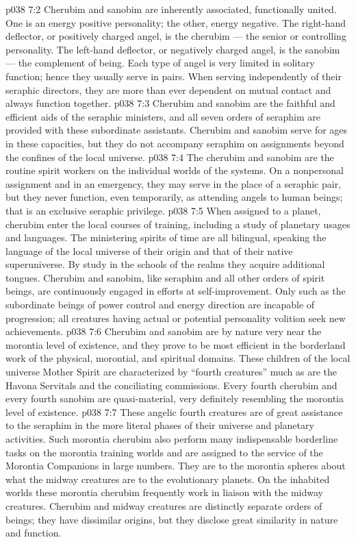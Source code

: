 \vs p038 7:2 Cherubim and sanobim are inherently associated, functionally united. One is an energy positive personality; the other, energy negative. The right\hyp{}hand deflector, or positively charged angel, is the cherubim --- the senior or controlling personality. The left\hyp{}hand deflector, or negatively charged angel, is the sanobim --- the complement of being. Each type of angel is very limited in solitary function; hence they usually serve in pairs. When serving independently of their seraphic directors, they are more than ever dependent on mutual contact and always function together.
\vs p038 7:3 \pc Cherubim and sanobim are the faithful and efficient aids of the seraphic ministers, and all seven orders of seraphim are provided with these subordinate assistants. Cherubim and sanobim serve for ages in these capacities, but they do not accompany seraphim on assignments beyond the confines of the local universe.
\vs p038 7:4 The cherubim and sanobim are the routine spirit workers on the individual worlds of the systems. On a nonpersonal assignment and in an emergency, they may serve in the place of a seraphic pair, but they never function, even temporarily, as attending angels to human beings; that is an exclusive seraphic privilege.
\vs p038 7:5 \pc When assigned to a planet, cherubim enter the local courses of training, including a study of planetary usages and languages. The ministering spirits of time are all bilingual, speaking the language of the local universe of their origin and that of their native superuniverse. By study in the schools of the realms they acquire additional tongues. Cherubim and sanobim, like seraphim and all other orders of spirit beings, are continuously engaged in efforts at self\hyp{}improvement. Only such as the subordinate beings of power control and energy direction are incapable of progression; all creatures having actual or potential personality volition seek new achievements.
\vs p038 7:6 \pc Cherubim and sanobim are by nature very near the morontia level of existence, and they prove to be most efficient in the borderland work of the physical, morontial, and spiritual domains. These children of the local universe Mother Spirit are characterized by “fourth creatures” much as are the Havona Servitals and the conciliating commissions. Every fourth cherubim and every fourth sanobim are quasi\hyp{}material, very definitely resembling the morontia level of existence.
\vs p038 7:7 These angelic fourth creatures are of great assistance to the seraphim in the more literal phases of their universe and planetary activities. Such morontia cherubim also perform many indispensable borderline tasks on the morontia training worlds and are assigned to the service of the Morontia Companions in large numbers. They are to the morontia spheres about what the midway creatures are to the evolutionary planets. On the inhabited worlds these morontia cherubim frequently work in liaison with the midway creatures. Cherubim and midway creatures are distinctly separate orders of beings; they have dissimilar origins, but they disclose great similarity in nature and function.
